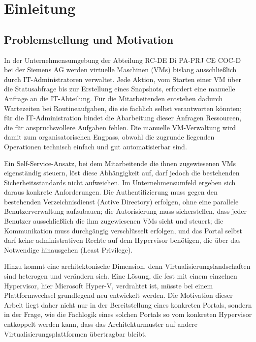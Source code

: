 \documentclass[12pt,a4paper]{article}
\begin{document}
\section{Einleitung}

\subsection{Problemstellung und Motivation}
\label{sec:problemstellung}

In der Unternehmensumgebung der Abteilung RC-DE Di PA-PRJ CE COC-D bei der Siemens AG werden virtuelle Maschinen (VMs) bislang ausschließlich durch IT-Administratoren verwaltet. Jede Aktion, vom Starten einer VM über die Statusabfrage bis zur Erstellung eines Snapshots, erfordert eine manuelle Anfrage an die IT-Abteilung. Für die Mitarbeitenden entstehen dadurch Wartezeiten bei Routineaufgaben, die sie fachlich selbst verantworten könnten; für die IT-Administration bindet die Abarbeitung dieser Anfragen Ressourcen, die für anspruchsvollere Aufgaben fehlen. Die manuelle VM-Verwaltung wird damit zum organisatorischen Engpass, obwohl die zugrunde liegenden Operationen technisch einfach und gut automatisierbar sind.

Ein Self-Service-Ansatz, bei dem Mitarbeitende die ihnen zugewiesenen VMs eigenständig steuern, löst diese Abhängigkeit auf, darf jedoch die bestehenden Sicherheitsstandards nicht aufweichen. Im Unternehmensumfeld ergeben sich daraus konkrete Anforderungen. Die Authentifizierung muss gegen den bestehenden Verzeichnisdienst (Active Directory) erfolgen, ohne eine parallele Benutzerverwaltung aufzubauen; die Autorisierung muss sicherstellen, dass jeder Benutzer ausschließlich die ihm zugewiesenen VMs sieht und steuert; die Kommunikation muss durchgängig verschlüsselt erfolgen, und das Portal selbst darf keine administrativen Rechte auf dem Hypervisor benötigen, die über das Notwendige hinausgehen (Least Privilege).

Hinzu kommt eine architektonische Dimension, denn Virtualisierungslandschaften sind heterogen und verändern sich. Eine Lösung, die fest mit einem einzelnen Hypervisor, hier Microsoft Hyper-V, verdrahtet ist, müsste bei einem Plattformwechsel grundlegend neu entwickelt werden. Die Motivation dieser Arbeit liegt daher nicht nur in der Bereitstellung eines konkreten Portals, sondern in der Frage, wie die Fachlogik eines solchen Portals so vom konkreten Hypervisor entkoppelt werden kann, dass das Architekturmuster auf andere Virtualisierungsplattformen übertragbar bleibt.
\end{document}
